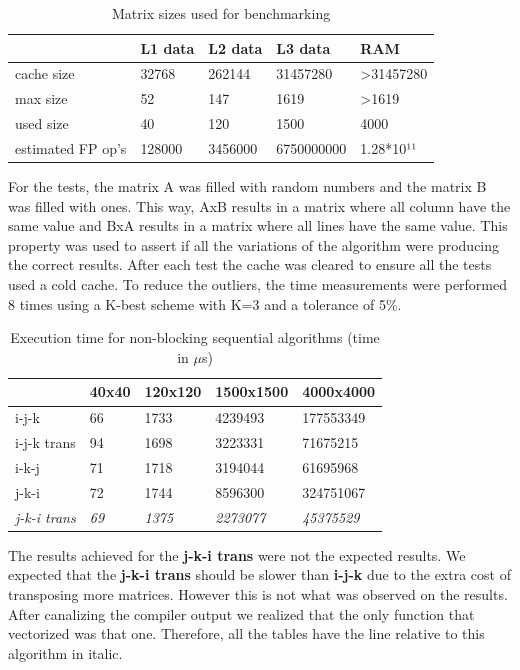 \documentclass[a4paper]{report}
\begin{document}
\begin{table}[H]
\centering
\begin{tabular}{|l|l|l|l|l|}
\hline
           & L1 data & L2 data & L3 data  & RAM                    \\ \hline
cache size & 32768   & 262144  & 31457280 & \textgreater{}31457280 \\ \hline
max size   & 52      & 147     & 1619     & \textgreater{}1619     \\ \hline
used size  & 40      & 120     & 1500     & 4000                   \\ \hline
estimated FP op's & 128000  & 3456000 & 6750000000 & 1.28*10¹¹     \\ \hline
\end{tabular}
\caption{Matrix sizes used for benchmarking}
\end{table}

For the tests, the matrix A was filled with random numbers and the matrix B was
filled with ones. This way, AxB results in a matrix where all column have the
same value and BxA results in a matrix where all lines have the same value. This
property was used to assert if all the variations of the algorithm were producing
the correct results. After each test the cache was cleared to ensure all the
tests used a cold cache. To reduce the outliers, the time measurements were
performed 8 times using a K-best scheme with K=3 and a tolerance of 5\%.

\begin{table}[H]
\centering
\begin{tabular}{|l|l|l|l|l|}
\hline
            & 40x40 & 120x120 & 1500x1500 & 4000x4000 \\ \hline
i-j-k       & 66    & 1733    & 4239493   & 177553349 \\ \hline
i-j-k trans & 94    & 1698    & 3223331   & 71675215  \\ \hline
i-k-j       & 71    & 1718    & 3194044   & 61695968  \\ \hline
j-k-i       & 72    & 1744    & 8596300   & 324751067 \\ \hline
\textit{j-k-i trans} & \textit{69}    & \textit{1375}    & \textit{2273077}   &
\textit{45375529}  \\ \hline
\end{tabular}
\caption{Execution time for non-blocking sequential algorithms (time in $\mu$s)}
\end{table}

The results achieved for the \textbf{j-k-i trans} were not the expected results.
We expected that the \textbf{j-k-i trans} should be slower than \textbf{i-j-k}
due to the extra cost of transposing more matrices. However this is not what was
observed on the results. After canalizing the compiler output we realized that
the only function that vectorized was that one. Therefore, all the tables have
the line relative to this algorithm in italic.
\end{document}
